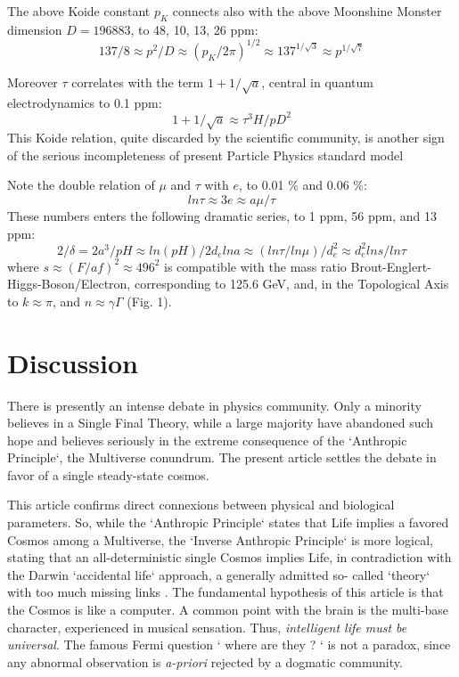 \documentclass[twoside,draft]{article}
\begin{document}
\begin{sloppypar}
The above Koide constant $p_K$ connects also with the above Moonshine Monster dimension \cite{Conway} $D = 196883$, to 48, 10, 13, 26 ppm:
$$137/8 \approx p^2/D  \approx (p_K/2\pi)^{1/2} \approx 137^{1/\sqrt3} \approx p^{1/\sqrt7}$$

Moreover $\tau$ correlates with the
term $1+1/\sqrt{a}$, central in quantum electrodynamics to 0.1 ppm:
\begin{equation}
1+1/\sqrt{a} \approx \tau^{3} H/pD^{2}
\end{equation}
This Koide relation, quite discarded by the scientific community, is another sign of the serious incompleteness of present Particle Physics standard model

Note the double relation of $\mu$ and $\tau$ with $e$, to 0.01 \% and 0.06 \%:
\begin{equation}
ln\tau \approx 3e \approx a\mu/\tau 
\end{equation}
These numbers enters the following dramatic series, to 1 ppm, 56 ppm, and 13 ppm:
\begin{equation}
2/\delta = 2a^3/pH \approx ln(pH)/2d_e lna \approx (ln\tau/ln\mu)/d_e^2 \approx d_e^2 ln s/ln\tau
\end{equation}
where $s \approx (F/af)^2 \approx 496^2 $ is compatible with the mass ratio Brout-Englert-Higgs-Boson/Electron, corresponding to 125.6 GeV, and, in the Topological Axis to $k \approx \pi $, and $n \approx \gamma \Gamma$ (Fig. 1).

\section {Discussion}

There is presently an intense debate in physics community. Only a minority believes in a Single
Final Theory, while a large majority have abandoned such hope and believes seriously in the extreme
consequence of the `Anthropic Principle`, the Multiverse conundrum. The present article settles the
debate in favor of a single steady-state cosmos.

This article confirms direct connexions \cite{Sanchez1} between physical and biological parameters. So,
while the `Anthropic Principle` states that Life implies a favored Cosmos among a Multiverse, the
`Inverse Anthropic Principle` \cite{Sanchez1} is more logical, stating that an all-deterministic single Cosmos
implies Life, in contradiction with the Darwin `accidental life` approach, a generally admitted so-
called `theory` with too much missing links \cite{Chauvin}. The fundamental hypothesis of
this article is that the Cosmos is like a computer. A common point with the brain is the multi-base
character, experienced in musical sensation. Thus, \textit{intelligent life must be universal}. The famous Fermi
question ` where are they ? ` is not a paradox, since any abnormal observation is \textit{a-priori} rejected by a
dogmatic community.


\end{sloppypar}
\end{document}
